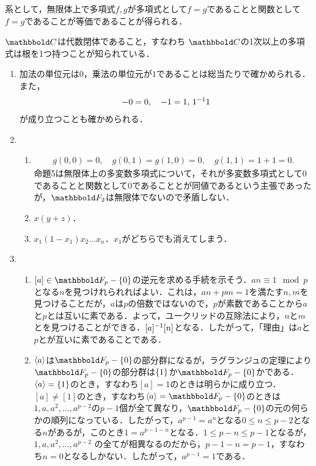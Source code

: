 \documentclass[9pt]{ltjsarticle}
\newcommand{\bbold}{\mathbbold}
\theoremstyle{break}
\theoremstyle{break}
\theoremstyle{break}
\theoremstyle{break}
\theoremstyle{break}
\theoremstyle{break}
\theoremstyle{break}
\theoremstyle{break}
\theoremstyle{break}
\theoremstyle{break}
\theoremstyle{break}
\theoremstyle{break}
\theoremstyle{break}
\theoremstyle{break}
\theoremstyle{break}
\theoremstyle{nonumberbreak}
\theoremstyle{nonumberbreak}
\begin{document}
系として，無限体上で多項式$f,g$が多項式として$f=g$であることと関数として$f=g$であることが等価であることが得られる．

$\C$は代数閉体であること，すなわち
$\C$の1次以上の多項式は根を1つ持つことが知られている．


\begin{enumerate}[label=(問題\arabic*)]
 \item 加法の単位元は$0$，乗法の単位元が$1$であることは総当たりで確かめられる．また，
\begin{align}
 -0 = 0,\quad -1 = 1,\, 1\inv = 1
\end{align}
が成り立つことも確かめられる．
 \item
\begin{enumerate}
 \item
\begin{align}
g(0,0) = 0,\quad g(0,1)=g(1,0) = 0,\quad g(1,1) = 1 + 1 = 0.
\end{align}
命題5は無限体上の多変数多項式について，それが多変数多項式として$0$であることと関数として$0$であることとが同値であるという主張であったが，$\bbold F_2$は無限体でないので矛盾しない．
 \item $x(y+z)$．
 \item $x_1(1-x_1)x_2\dots x_n$．$x_1$がどちらでも消えてしまう．
\end{enumerate}
 \item
\begin{enumerate}
 \item
$[a]\in \bbold F_p-\zeroset$の逆元を求める手続を示そう．$an \equiv 1\mod p$となる$n$を見つけれられればよい．これは，$an + pm = 1$を満たす$n,m$を見つけることだが，$a$は$p$の倍数ではないので，$p$が素数であることから$a$と$p$とは互いに素である．よって，ユークリッドの互除法により，$n$と$m$とを見つけることができる．$[a]\inv = [n]$となる．したがって，「理由」は$a$と$p$とが互いに素であることである．
 \item $\gen{a}$は$\bbold F_p-\zeroset$の部分群になるが，ラグランジュの定理により$\bbold F_p-\zeroset$の部分群は$\set{1}$か$\bbold F_p-\zeroset$かである．$\gen{a}=\set{1}$のとき，すなわち$[a]=1$のときは明らかに成り立つ．$[a]\neq [1]$のとき，すなわち$\gen{a}=\bbold F_p-\zeroset$のときは
$1,a,a^2,\dots,a^{p-2}$の$p-1$個が全て異なり，$\bbold F_p-\zeroset$の元の何らかの順列になっている．したがって，$a^{p-1}=a^n$となる$0\le n \le p-2$となる$n$があるが，このとき$1=a^{p-1-n}$となる．$1\le p-n \le p-1$となるが，$1,a,a^2,\dots,a^{p-2}$
の全てが相異なるのだから，$p-1-n=p-1$，すなわち$n=0$となるしかない．したがって，$a^{p-1}=1$である．

\end{enumerate}
\end{enumerate}
\end{document}
